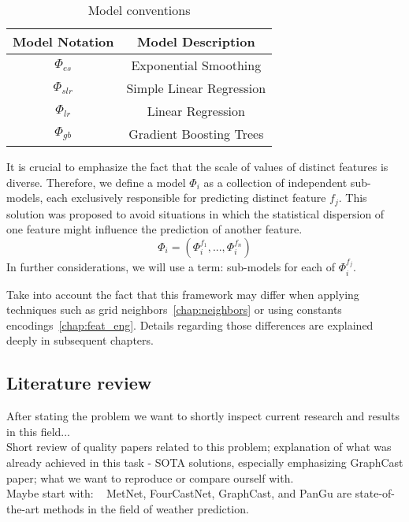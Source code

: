  
\begin{table}[!h]
    \centering
    \begin{tabular}{|c|c|}
        \hline
        Model Notation & Model Description \\
        \hline
        $\Phi_{es}$  & Exponential Smoothing \\
        $\Phi_{slr}$ & Simple Linear Regression \\
        $\Phi_{lr}$  & Linear Regression \\
        $\Phi_{gb}$ & Gradient Boosting Trees \\
        \hline
    \end{tabular}
\caption{Model conventions}
\end{table}
 
 
 \noindent It is crucial to emphasize the fact that the scale of values of distinct features is diverse. Therefore, we define a model $\Phi_i$ as a collection of independent sub-models, each exclusively responsible for predicting distinct feature $f_j$. This solution was proposed to avoid situations in which the statistical dispersion of one feature might influence the prediction of another feature.  
 \[
 \Phi_{i} = (\Phi_{i}^{f_1}, ..., \Phi_{i}^{f_n})
 \]
 In further considerations, we will use a term: sub-models for each of $\Phi_{i}^{f_j}$.



\noindent Take into account the fact that this framework may differ when applying techniques such as grid neighbors~\ref{chap:neighbors} or using constants encodings~\ref{chap:feat_eng}. Details regarding those differences are explained deeply in subsequent chapters.

 \newpage
 
 \subsection{Literature review}
 After stating the problem we want to shortly inspect current research and results in this field... \\
Short review of quality papers related to this problem; explanation of what was already achieved in this task - SOTA solutions, especially emphasizing GraphCast paper; what we want to reproduce or compare ourself with. \\
\noindent Maybe start with: ~\cite{WFConsiderations}
MetNet, FourCastNet, GraphCast, and PanGu are state-of-the-art methods in the field of weather prediction.


